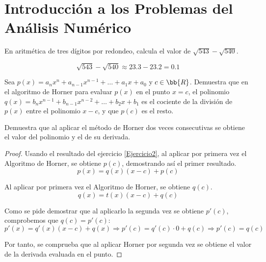 \section{Introducción a los Problemas del Análisis Numérico} \label{sec:Rel1}


\begin{ejercicio}
    En aritmética de tres dígitos por redondeo, calcula el valor de $\sqrt{543}-\sqrt{540}$.

    \begin{equation*}
        \sqrt{543}-\sqrt{540} \approx 23.3-23.2 = 0.1
    \end{equation*}
\end{ejercicio}

\begin{ejercicio}\label{Ejercicio2}
    Sea $p(x) = a_n x^n + a_{n-1}x^{n-1} + \dots + a_1x+a_0$ y $c\in\bb{R}$. Demuestra que en el algoritmo de Horner para evaluar $p(x)$ en el punto $x = c$, el polinomio $q(x) = b_n x^{n-1} + b_{n-1} x^{n-2} + \dots + b_2x + b_1$ es el cociente de la división de $p(x)$ entre el polinomio $x-c$, y que $p(c)$ es el resto.
\end{ejercicio}

\begin{ejercicio}
    Demuestra que al aplicar el método de Horner dos veces consecutivas se obtiene el valor del polinomio y el de su derivada.
    \begin{proof}
        Usando el resultado del ejercicio \ref{Ejercicio2}, al aplicar por primera vez el Algoritmo de Horner, se obtiene $p(c)$, demostrando así el primer resultado.
        $$p(x) = q(x)(x-c)+p(c)$$
    
        Al aplicar por primera vez el Algoritmo de Horner, se obtiene $q(c)$.
        $$q(x) = t(x)(x-c)+q(c)$$
    
        Como se pide demostrar que al aplicarlo la segunda vez se obtiene $p'(c)$, comprobemos que $q(c)=p'(c)$:
        $$p'(x) = q'(x)(x-c) + q(x) \Longrightarrow p'(c) = q'(c)\cdot 0 + q(c) \Longrightarrow p'(c) = q(c)$$
    
        Por tanto, se comprueba que al aplicar Horner por segunda vez se obtiene el valor de la derivada evaluada en el punto.
    \end{proof}
\end{ejercicio}

